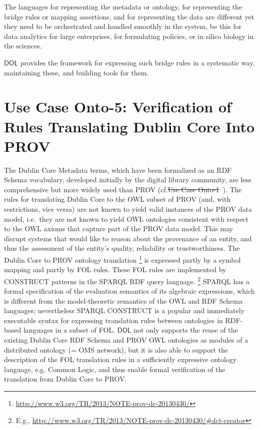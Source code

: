 \documentclass[10pt,fleqn,final]{scrreprt}
\newcommand*{\DOL}{\ensuremath{\mathsf{DOL}}\xspace}
\newenvironment{definitions}[0]{\medskip }{}
\providecommand{\DIFadd}[1]{{\protect\color{blue}\uwave{#1}}} %
\providecommand{\DIFdel}[1]{{\protect\color{red}\sout{#1}}}                      %
\providecommand{\DIFaddbegin}{} %
\providecommand{\DIFaddend}{} %
\providecommand{\DIFdelbegin}{} %
\providecommand{\DIFdelend}{} %
\begin{document}
\begin{definitions}
The languages for representing the metadata or ontology, for representing the bridge rules or mapping assertions, and for representing the data are different yet 
they need to be orchestrated and handled smoothly in the system, be this for data analytics for large enterprises, for formulating policies, or in silico biology in the 
sciences. 

\DOL  provides the framework for expressing such bridge rules in a systematic way, maintaining these, and building tools for them. 


\section{Use Case Onto-5: Verification of Rules Translating Dublin Core Into PROV}
The Dublin Core Metadata terms, which have been formalized as an RDF Schema vocabulary, developed initially by the digital library community, are less 
comprehensive but more widely used than PROV (cf.\DIFdelbegin \DIFdel{Use Case Onto-1}\DIFdelend \DIFaddbegin \ \DIFadd{subclause~\ref{onto-1}}\DIFaddend ). The rules for translating Dublin Core to the OWL subset of PROV (and, with restrictions, 
vice versa) are not known to yield valid instances of the PROV data model, i.e.\ they are not known to yield OWL ontologies consistent with respect to the OWL axioms that 
capture part of the PROV data model. This may disrupt systems that would like to reason about the provenance of an entity, and thus the assessment of the 
entity's quality, reliability or trustworthiness.
The Dublin Core to PROV ontology translation%
\footnote{\url{http://www.w3.org/TR/2013/NOTE-prov-dc-20130430/}}
  is expressed partly by a symbol mapping and partly by FOL rules. These FOL rules are implemented by CONSTRUCT patterns in the SPARQL RDF query language.%
\footnote{E.g., \url{http://www.w3.org/TR/2013/NOTE-prov-dc-20130430/\#dct-creator}} 
SPARQL has a formal specification of the evaluation semantics of its algebraic expressions, which 
 is different from the model-theoretic semantics of the OWL and RDF Schema languages; nevertheless 
SPARQL CONSTRUCT is a popular and immediately executable syntax for expressing translation rules 
 between ontologies in RDF-based languages in a subset of FOL.
\DOL  not only supports the reuse of the existing Dublin Core RDF Schema and PROV OWL ontologies as 
 modules of a distributed ontology (= OMS network), but it is also able to support the description 
of the FOL translation rules in a sufficiently expressive ontology language, e.g. Common Logic, 
and thus enable formal verification of the translation from Dublin Core to PROV.




\end{definitions}
\end{document}
